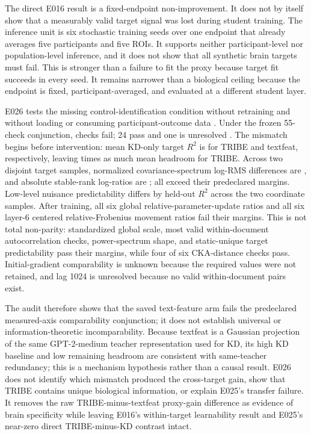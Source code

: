 The direct E016 result is a fixed-endpoint non-improvement.
It does not by itself show that a measurably valid target signal was lost during student training.
The inference unit is six stochastic training seeds over one endpoint that already averages five participants and five ROIs.
It supports neither participant-level nor population-level inference, and it does not show that all synthetic brain targets must fail.
This is stronger than a failure to fit the proxy because target fit succeeds in every seed.
It remains narrower than a biological ceiling because the endpoint is fixed, participant-averaged, and evaluated at a different student layer.

E026 tests the missing control-identification condition without retraining and without loading or consuming participant-outcome data .
Under the frozen 55-check conjunction,  checks fail; 24 pass and one is unresolved .
The mismatch begins before intervention: mean KD-only target $R^2$ is  for TRIBE and textfeat, respectively, leaving  times as much mean headroom for TRIBE.
Across two disjoint target samples, normalized covariance-spectrum log-RMS differences are , and absolute stable-rank log-ratios are ; all exceed their predeclared margins.
Low-level nuisance predictability differs by  held-out $R^2$ across the two coordinate samples.
After training, all six global relative-parameter-update ratios and all six layer-6 centered relative-Frobenius movement ratios fail their margins.
This is not total non-parity: standardized global scale, most valid within-document autocorrelation checks, power-spectrum shape, and static-unique target predictability pass their margins, while four of six CKA-distance checks pass.
Initial-gradient comparability is unknown because the required values were not retained, and lag 1024 is unresolved because no valid within-document pairs exist.

The audit therefore shows that the saved text-feature arm fails the predeclared measured-axis comparability conjunction; it does not establish universal or information-theoretic incomparability.
Because textfeat is a Gaussian projection of the same GPT-2-medium teacher representation used for KD, its high KD baseline and low remaining headroom are consistent with same-teacher redundancy; this is a mechanism hypothesis rather than a causal result.
E026 does not identify which mismatch produced the cross-target gain, show that TRIBE contains unique biological information, or explain E025's transfer failure.
It removes the raw TRIBE-minus-textfeat proxy-gain difference as evidence of brain specificity while leaving E016's within-target learnability result and E025's near-zero direct TRIBE-minus-KD contrast intact.

